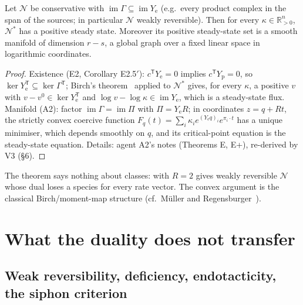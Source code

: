 \documentclass[11pt,a4paper]{report}
\newcommand{\Net}{\mathcal{N}}
\newcommand{\Nd}{\mathcal{N}^{*}}
\newcommand{\Ye}{Y_{\mathrm e}}
\newcommand{\Yp}{Y_{\mathrm p}}
\newcommand{\im}{\operatorname{im}}
\newcommand{\Rp}{\mathbb{R}_{>0}}
\newcommand{\tp}{^{\mathsf T}}
\begin{document}
\begin{theorem}\label{thm:WRdual}
Let \(\Net\) be conservative with \(\im\Gamma\subseteq\im\Ye\) (e.g.\ every product complex in the span of the sources;
in particular \(\Net\) weakly reversible). Then for every \(\kappa\in\Rp^n\), \(\Nd\) has a positive steady state.
Moreover its positive steady-state set is a smooth manifold of dimension \(r-s\), a global graph over a fixed linear
space in logarithmic coordinates.
\end{theorem}
\begin{proof}
Existence (E2, Corollary E2.5\('\)): \(c\tp\Ye=0\) implies \(c\tp\Yp=0\), so \(\ker\Ye\tp\subseteq\ker\Gamma\tp\);
Birch's theorem~\autocite{HornJackson1972,Feinberg2019} applied to \(\Nd\) gives, for every \(\kappa\), a positive \(v\) with
\(v-v^0\in\ker\Ye\tp\) and \(\log v-\log\kappa\in\im\Ye\), which is a steady-state flux. Manifold (A2): factor
\(\im\Gamma=\im\Pi\) with \(\Pi=\Ye R\); in coordinates \(z=q+Rt\), the strictly convex coercive function
\(F_q(t)=\sum_i\kappa_ie^{(\Ye q)_i}e^{\pi_i\cdot t}\) has a unique minimiser, which depends smoothly on \(q\), and its
critical-point equation is the steady-state equation. Details: agent A2's notes (Theorems E, E+), re-derived by V3
(§6).
\end{proof}

The theorem says nothing about classes:  with \(R=2\) gives weakly reversible \(\Net\) whose dual loses
a species for every rate vector. The convex argument is the classical Birch/moment-map structure (cf.\ Müller and
Regensburger~\autocite{MullerRegensburger2012}).

\section{What the duality does not transfer}\label{sec:nontransfer}

\subsection{Weak reversibility, deficiency, endotacticity, the siphon criterion}
\end{document}
